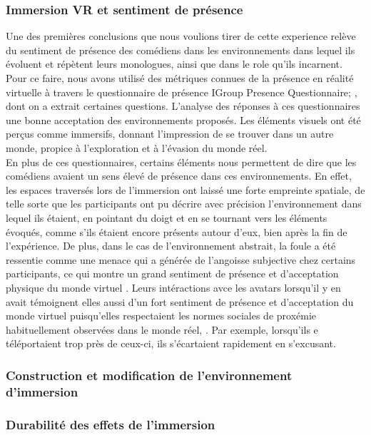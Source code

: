 \subsubsection{Immersion VR et sentiment de présence}
Une des premières conclusions que nous voulions tirer de cette experience relève du sentiment de présence
des comédiens dans les environnements dans lequel ils évoluent et répètent leurs monologues, ainsi que dans
le role qu'ils incarnent. Pour ce faire, nous avons utilisé des métriques connues de la présence en réalité virtuelle à travers
le questionnaire de présence IGroup Presence Questionnaire; \cite{Schubert}, dont on a extrait
certaines questions. 
L'analyse des réponses à ces questionnaires une bonne acceptation des environnements proposés. Les éléments
visuels ont été perçus comme immersifs, donnant l’impression de se trouver dans un autre monde, propice à 
l’exploration et à l’évasion du monde réel. 
\\
En plus de ces questionnaires, certains éléments nous permettent de dire que les comédiens avaient un sens 
élevé de présence dans ces environnements. En effet, les espaces traversés lors de l'immersion ont laissé une forte
empreinte spatiale, de telle sorte que les participants ont pu décrire avec précision l'environnement dans lequel 
ils étaient, en pointant du doigt et en se tournant vers les éléments évoqués, comme s'ils étaient encore présents autour
d'eux, bien après la fin de l'expérience. De plus, dans le cas de l'environnement abstrait, la foule a été ressentie comme
une menace qui a générée de l'angoisse subjective chez certains participants, ce qui montre un grand sentiment de présence
et d'acceptation physique du monde virtuel \cite{Zhang}. Leurs intéractions avce les avatars lorsqu'il y en avait témoignent elles aussi
d'un fort sentiment de présence et d'acceptation du monde virtuel puisqu'elles respectaient les normes sociales de proxémie 
habituellement observées dans le monde réel, \cite{Wilcox}. Par exemple, lorsqu'ils e téléportaient trop près de ceux-ci, ils s’écartaient rapidement en s’excusant. 


\subsubsection{Construction et modification de l'environnement d'immersion}
\subsubsection{Durabilité des effets de l'immersion}



